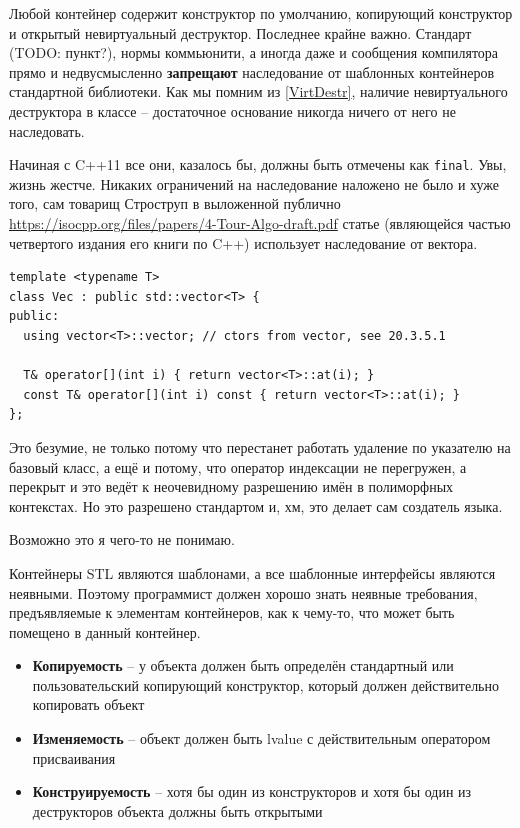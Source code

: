 \documentclass[a4paper,12pt,oneside]{article}
\begin{document}
Любой контейнер содержит конструктор по умолчанию, копирующий конструктор и открытый невиртуальный деструктор. Последнее крайне важно. Стандарт (TODO: пункт?), нормы коммьюнити, а иногда даже и сообщения компилятора прямо и недвусмысленно \textbf{запрещают} наследование от шаблонных контейнеров стандартной библиотеки. Как мы помним из \ref{VirtDestr}, наличие невиртуального деструктора в классе -- достаточное основание никогда ничего от него не наследовать.

Начиная с C++11 все они, казалось бы, должны быть отмечены как \lstinline!final!. Увы, жизнь жестче. Никаких ограничений на наследование наложено не было и хуже того, сам товарищ Строструп в выложенной публично \url{https://isocpp.org/files/papers/4-Tour-Algo-draft.pdf} статье (являющейся частью четвертого издания его книги по C++) использует наследование от вектора.

\begin{lstlisting}
template <typename T>
class Vec : public std::vector<T> {
public:
  using vector<T>::vector; // ctors from vector, see 20.3.5.1

  T& operator[](int i) { return vector<T>::at(i); }
  const T& operator[](int i) const { return vector<T>::at(i); }
};
\end{lstlisting}

Это безумие, не только потому что перестанет работать удаление по указателю на базовый класс, а ещё и потому, что оператор индексации не перегружен, а перекрыт и это ведёт к неочевидному разрешению имён в полиморфных контекстах. Но это разрешено стандартом и, хм, это делает сам создатель языка.

Возможно это я чего-то не понимаю.

Контейнеры STL являются шаблонами, а все шаблонные интерфейсы являются неявными. Поэтому программист должен хорошо знать неявные требования, предъявляемые к элементам контейнеров, как к чему-то, что может быть помещено в данный контейнер.

\begin{itemize}
\item \textbf{Копируемость} -- у объекта должен быть определён стандартный или пользовательский копирующий конструктор, который должен действительно копировать объект
\item \textbf{Изменяемость} -- объект должен быть lvalue с действительным оператором присваивания
\item \textbf{Конструируемость} -- хотя бы один из конструкторов и хотя бы один из деструкторов объекта должны быть открытыми
\end{itemize}
\end{document}
